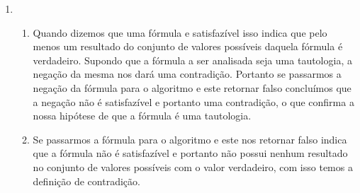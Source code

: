 \begin{enumerate}
\begin{enumerate}
				$(P \land \neg Q) \lor (\neg P \land Q)$ e $(P \lor Q) \land \neg (P \land Q)$ s\~ao f\'ormulas equivalentes da l\'ogica proposicional, j\'a que apresentam resultados iguais pela tabela verdade.		
			\end{enumerate}
			
			\item 
			\begin{enumerate}
				
				\item Quando dizemos que uma f\'ormula e satisfaz\'ivel isso indica que pelo menos um resultado do conjunto de valores poss\'iveis daquela f\'ormula \'e verdadeiro. Supondo que a f\'ormula a ser analisada seja uma tautologia, a nega\c{c}\~ao da mesma nos dar\'a uma contradi\c{c}\~ao. Portanto se passarmos a nega\c{c}\~ao da f\'ormula para o algoritmo e este retornar falso conclu\'imos que a nega\c{c}\~ao n\~ao \'e satisfaz\'ivel e portanto uma contradi\c{c}\~ao, o que confirma a nossa hip\'otese de que a f\'ormula \'e uma tautologia.
				
				\item Se passarmos a f\'ormula para o algoritmo e este nos retornar falso indica que a f\'ormula n\~ao \'e satisfaz\'ivel e portanto n\~ao possui nenhum resultado no conjunto de valores poss\'iveis com o valor verdadeiro, com isso temos a defini\c{c}\~ao de contradi\c{c}\~ao.
				
			\end{enumerate}
			
			
	\end{enumerate}